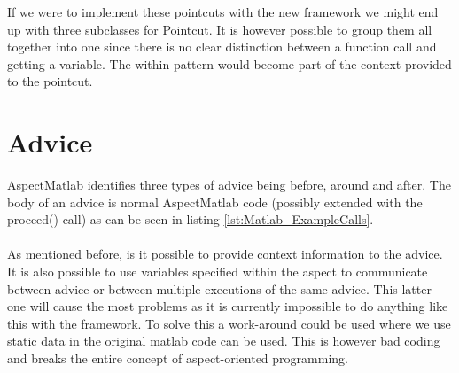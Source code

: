 \documentclass[a4paper]{report}
\begin{document}
If we were to implement these pointcuts with the new framework we might end up with three subclasses for Pointcut. It is however possible to group them all together into one since there is no clear distinction between a function call and getting a variable. The within pattern would become part of the context provided to the pointcut.

\section{Advice}
AspectMatlab identifies three types of advice being before, around and after. The body of an advice is normal AspectMatlab code (possibly extended with the proceed() call) as can be seen in listing \ref{lst:Matlab_ExampleCalls}.\\
\\
As mentioned before, is it possible to provide context information to the advice. It is also possible to use variables specified within the aspect to communicate between advice or between multiple executions of the same advice. This latter one will cause the most problems as it is currently impossible to do anything like this with the framework. To solve this a work-around could be used where we use static data in the original matlab code can be used. This is however bad coding and breaks the entire concept of aspect-oriented programming.
\end{document}
